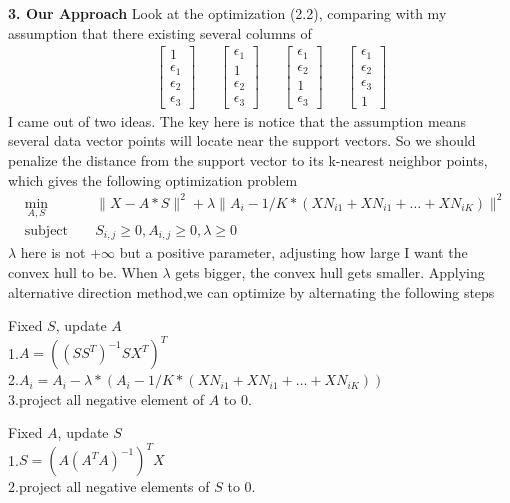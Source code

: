 \documentclass[14pt]{book}
\begin{document}
{\bf 3. Our Approach}
 Look at the optimization (2.2), comparing with my assumption that 
 there existing several columns of 
\begin{equation}
\begin{aligned}
& &\begin{bmatrix}
1\\ 
\epsilon_1\\ 
\epsilon_2\\ 
\epsilon_3
\end{bmatrix}
& & \begin{bmatrix}
\epsilon_1\\ 
1\\ 
\epsilon_2\\ 
\epsilon_3
\end{bmatrix}
& & \begin{bmatrix}
\epsilon_1\\ 
\epsilon_2\\ 
1\\ 
\epsilon_3
\end{bmatrix}
& & \begin{bmatrix}
\epsilon_1\\ 
\epsilon_2\\ 
\epsilon_3\\ 
1
\end{bmatrix}
\end{aligned}
\end{equation}
I came out of two ideas. The key here is notice that the assumption means several data vector points will locate near the support vectors. So we should  penalize the distance from the support vector to its k-nearest neighbor points, which gives  the following optimization problem
\begin{equation}
\begin{aligned}
& \underset{A,S}{\text{min}}
& & \parallel X-A*S \parallel ^2 + \lambda \parallel A_i-1/K*(XN_{i1}+XN_{i1}+ \ldots +XN_{iK}) \parallel^2  \\
& \text{subject to}
& & S_{i,j}\geq 0,A_{i,j}\geq 0, \lambda \geq 0
\end{aligned}
\end{equation}
$\lambda$ here is not +$\infty$ but a positive parameter, adjusting how large I want the convex hull to be.  
When $\lambda$ gets bigger, the convex hull gets smaller.
Applying alternative direction method,we can optimize by alternating the following steps 

Fixed $S$, update $A$ \\
1.$A = ((SS^T)^{-1}SX^T)^T$\\
2.$A_i = A_i - \lambda*(A_i-1/K*(XN_{i1}+XN_{i1}+ \ldots +XN_{iK}))$\\
3.project all negative element of $A$ to $0$.\\
\par Fixed $A$, update $S$ \\ 
1.$S =(A(A^TA)^{-1})^TX$\\
2.project all negative elements of $S$ to $0$.
\end{document}
